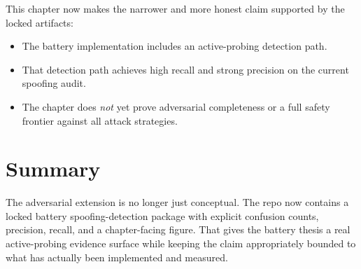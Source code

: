This chapter now makes the narrower and more honest claim supported by the
locked artifacts:

\begin{itemize}
  \item The battery implementation includes an active-probing detection path.
  \item That detection path achieves high recall and strong precision on the
    current spoofing audit.
  \item The chapter does \emph{not} yet prove adversarial completeness or a
    full safety frontier against all attack strategies.
\end{itemize}

\section{Summary}

The adversarial extension is no longer just conceptual.  The repo now
contains a locked battery spoofing-detection package with explicit confusion
counts, precision, recall, and a chapter-facing figure.  That gives the
battery thesis a real active-probing evidence surface while keeping the claim
appropriately bounded to what has actually been implemented and measured.
